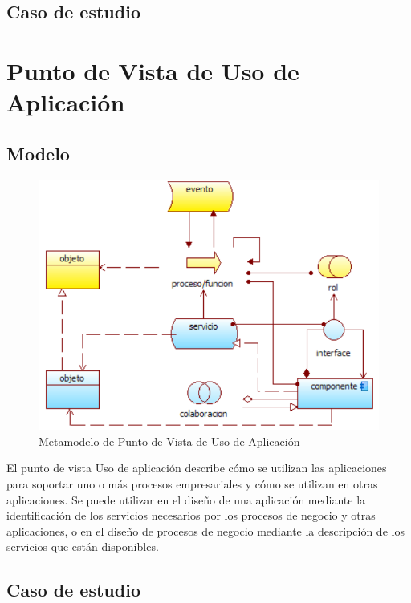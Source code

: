 \subsection{Caso de estudio}

\newpage

\section{Punto de Vista de Uso de Aplicación}

\subsection{Modelo}

\begin{figure}[th!]
	\centering
	\includegraphics[width=0.5\linewidth]{arquitectura/imagenes/modeloUsoAplicacion}
	\caption{Metamodelo de Punto de Vista de Uso de Aplicación \cite{pun10}}
	\label{fig:metamodelo de punto de vista de uso de aplicación}
\end{figure}
El punto de vista Uso de aplicación describe cómo se utilizan las aplicaciones para soportar uno o más procesos empresariales y cómo se utilizan en otras aplicaciones. Se puede utilizar en el diseño de una aplicación mediante la identificación de los servicios necesarios por los procesos de negocio y otras aplicaciones, o en el diseño de procesos de negocio mediante la descripción de los servicios que están disponibles.

\subsection{Caso de estudio}

\newpage

